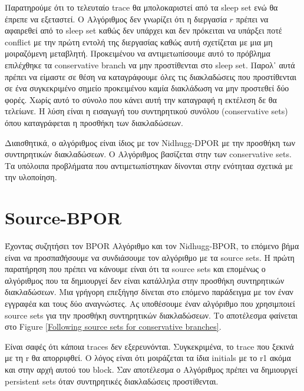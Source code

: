 
Παρατηρούμε ότι το τελευταίο trace θα μπολοκαριστεί από τα sleep set ενώ θα έπρεπε να εξεταστεί. Ο Αλγόριθμος δεν γνωρίζει ότι η διεργασία
$r$ πρέπει να αφαιρεθεί από το sleep set καθώς δεν υπάρχει και δεν πρόκειται να υπάρξει ποτέ conflict με την πρώτη εντολή της διεργασίας καθώς 
αυτή σχετίζεται με μια μη μοιραζόμενη μεταβλητή. Προκειμένου να αντιμετωπίσουμε αυτό το πρόβλημα επιλέχθηκε τα 
conservative branch να μην προστίθενται στο sleep set. Παρολ᾽ αυτά πρέπει να είμαστε σε θέση να καταγράφουμε όλες τις διακλαδώσεις που προστίθενται σε
ένα συγκεκριμένο σημείο προκειμένου καμία διακλάδωση να μην προστεθεί δύο φορές.
Χωρίς αυτό το σύνολο που κάνει αυτή την καταγραφή η εκτέλεση δε θα τελείωνε.
Η λύση είναι η εισαγωγή του συντηρητικού συνόλου (conservative sets) όπου καταγράφεται η προσθήκη των διακλαδώσεων.

Διαισθητικά, ο αλγόριθμος είναι ίδιος με τον Nidhugg-DPOR με την προσθήκη των συντηρητικών διακλαδώσεων.
Ο Αλγόριθμος βασίζεται στην των conservative sets.
Τα υπόλοιπα προβλήματα που αντιμετωπίστηκαν δίνονται στην ενότηταα σχετικά με την υλοποίηση.


\section{Source-BPOR}

Έχοντας συζητήσει τον BPOR Αλγόριθμο και τον Nidhugg-BPOR, το επόμενο βήμα είναι να προσπαϑήσουμε να συνδιάσουμε τον αλγόριθμο με τα source sets.
Η πρώτη παρατήρηση που πρέπει να κάνουμε είναι ότι τα source sets και επομένως ο αλγόριθμος που τα δημιουργεί δεν είναι κατάλληλα στην 
προσθήκη συντηρητικών διακλαδώσεων. Μια γρήγορη επεξήγησ δίνεται στο επόμενο παράδειγμα με τον έναν εγγραφέα και τους δύο αναγνώστες.
Ας υποθέσουμε έναν αλγόριθμο που χρησιμποιεί source sets για την προσθήκη συντηρητικών διακλαδώσεων.
Το αποτέλεσμα φαίνεται στο Figure \ref{Following source sets for conservative branches}.


Είναι σαφές ότι κάποια traces δεν εξερευνόνται. Συγκεκριμένα, το trace που ξεκινά με τη r θα απορριφθεί. Ο λόγος είναι ότι μοιράζεται τα ίδια
initials με το r1 ακόμα και στην αρχή αυτού του block. Σαν αποτέλεσμα ο Αλγόριθμος πρέπει να δημιουργεί
persistent sets όταν συντηρητικές διακλαδώσεις προστίθενται.

